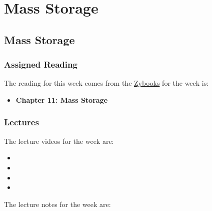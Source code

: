 \clearpage

\renewcommand{\ChapTitle}{Mass Storage}
\renewcommand{\SectionTitle}{Mass Storage}

\chapter{\ChapTitle}
\section{\SectionTitle}

\subsection{Assigned Reading}

The reading for this week comes from the \href{https://learn.zybooks.com/zybook/COLORADOCSPB3753KnoxFall2024}{Zybooks} for the week is:

\begin{itemize}
    \item \textbf{Chapter 11: Mass Storage}
\end{itemize}

\subsection{Lectures}

The lecture videos for the week are:

\begin{itemize}
    \item {}
    \item {}
    \item {}
    \item {}
\end{itemize}

\noindent The lecture notes for the week are:

